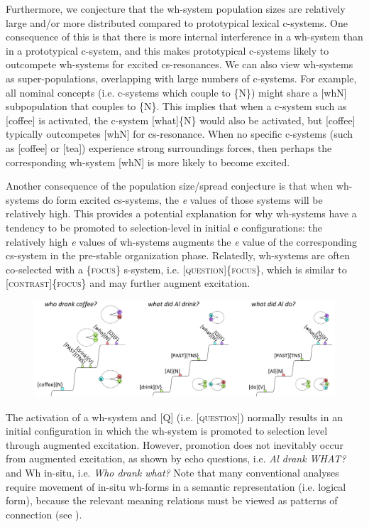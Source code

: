   Furthermore, we conjecture that the wh-system population sizes are relatively large and/or more distributed compared to prototypical lexical c-systems. One consequence of this is that there is more internal interference in a wh-system than in a prototypical c-system, and this makes prototypical c-systems likely to outcompete wh-systems for excited cs-resonances. We can also view wh-systems as super-populations, overlapping with large numbers of c-systems. For example, all nominal concepts (i.e. c-systems which couple to \{N\}) might share a [whN] subpopulation that couples to \{N\}. This implies that when a c-system such as [coffee] is activated, the c-system [what]\{N\} would also be activated, but [coffee] typically outcompetes [whN] for cs-resonance. When no specific c-systems (such as [coffee] or [tea]) experience strong surroundings forces, then perhaps the corresponding wh-system [whN] is more likely to become excited.

  Another consequence of the population size/spread conjecture is that when wh-systems do form excited cs-systems, the \textit{e} values of those systems will be relatively high. This provides a potential explanation for why wh-systems have a tendency to be promoted to selection-level in initial e configurations: the relatively high \textit{e} values of wh-systems augments the \textit{e} value of the corresponding cs-system in the pre-stable organization phase. Relatedly, wh-systems are often co-selected with a \{\textsc{focus}\} s-system, i.e. [\textsc{question}]\{\textsc{focus}\}, which is similar to [\textsc{contrast}]\{\textsc{focus}\} and may further augment excitation.

  
\begin{figure}
\includegraphics[width=\textwidth]{figures/Tilsen-img159.png}
\caption{\missingcaption}
\label{fig:}
\end{figure}
 

  The activation of a wh-system and [Q] (i.e. [\textsc{question}]) normally results in an initial configuration in which the wh-system is promoted to selection level through augmented excitation. However, promotion does not inevitably occur from augmented excitation, as shown by echo questions, i.e. \textit{Al drank WHAT?} and Wh in-situ, i.e. \textit{Who drank what?} Note that many conventional analyses require movement of in-situ wh-forms in a semantic representation (i.e. logical form), because the relevant meaning relations must be viewed as patterns of connection (see \citealt{Reinhart1998,Watanabe1992}).

